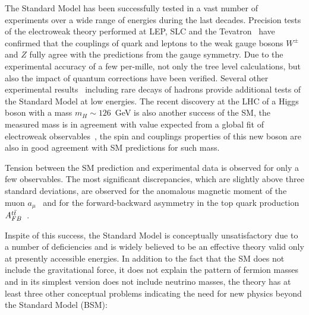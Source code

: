 The Standard Model has been successfully tested in a vast number of experiments over a wide range of energies during the last decades.
Precision tests of the electroweak theory performed at LEP, SLC and the Tevatron~\cite{smtest} have 
confirmed that the couplings of quark and leptons to the weak gauge bosons $W^{\pm}$  and $Z$ fully agree 
with the predictions from the gauge symmetry. Due to the experimental accuracy of a few per-mille, not only the tree level
calculations, but also the impact of quantum corrections have
been verified. Several other experimental results~\cite{pdg}
including rare decays of hadrons provide additional tests of the Standard Model at low energies. 
The recent discovery at the LHC of a Higgs boson   with a mass $m_H \sim 126$~GeV \cite{AHiggsO,CHiggsO} 
is also another success of the SM, the measured mass is in agreement with value expected from a 
global fit of electroweak observables~\cite{gfitter}, the spin and couplings properties of this new boson are also 
in good agreement with SM predictions for such mass.

Tension between the SM prediction and  experimental data is observed for only a few observables. 
The most significant discrepancies, which are slightly above three standard deviations, are observed for the anomalous magnetic moment 
of the muon $a_{\mu}$~\cite{gminus2} and for the forward-backward asymmetry in the top quark production $A_{FB}^{t\bar{t}}$~\cite{FBasymmetry}.   


Inspite of this success, the Standard Model is conceptually unsatisfactory due to a number of deficiencies and is
widely believed to be an effective theory valid only at presently accessible energies. In addition to the fact that 
the SM does not  include the  gravitational force, it does not explain the pattern of fermion masses and in its simplest 
version does not include neutrino masses, the theory has at least three other conceptual problems indicating the need 
for new physics beyond the Standard Model (BSM):

